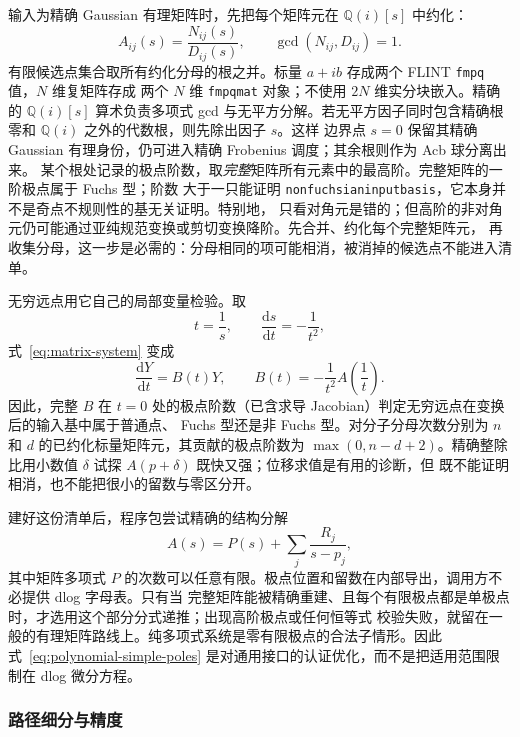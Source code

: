 \documentclass[11pt,a4paper]{ctexart}
\newcommand{\dd}{\mathrm d}
\renewcommand{\_}{\origunderscore\allowbreak}
\begin{document}
输入为精确 Gaussian 有理矩阵时，先把每个矩阵元在 $\mathbb Q(i)[s]$ 中约化：
\begin{equation}
 A_{ij}(s)=\frac{N_{ij}(s)}{D_{ij}(s)},
 \qquad \gcd(N_{ij},D_{ij})=1.
\end{equation}
有限候选点集合取所有约化分母的根之并。标量 $a+ib$ 存成两个 FLINT \texttt{fmpq} 值，$N$ 维复矩阵存成
两个 $N$ 维 \texttt{fmpq\_mat} 对象；不使用 $2N$ 维实分块嵌入。精确的 $\mathbb Q(i)[s]$ 算术负责多项式
gcd 与无平方分解。若无平方因子同时包含精确根零和 $\mathbb Q(i)$ 之外的代数根，则先除出因子 $s$。这样
边界点 $s=0$ 保留其精确 Gaussian 有理身份，仍可进入精确 Frobenius 调度；其余根则作为 Acb 球分离出来。
某个根处记录的极点阶数，取\emph{完整}矩阵所有元素中的最高阶。完整矩阵的一阶极点属于 Fuchs 型；阶数
大于一只能证明 \texttt{non\_fuchsian\_input\_basis}，它本身并不是奇点不规则性的基无关证明。特别地，
只看对角元是错的；但高阶的非对角元仍可能通过亚纯规范变换或剪切变换降阶。先合并、约化每个完整矩阵元，
再收集分母，这一步是必需的：分母相同的项可能相消，被消掉的候选点不能进入清单。

无穷远点用它自己的局部变量检验。取
\begin{equation}
 t=\frac{1}{s},\qquad \frac{\dd s}{\dd t}=-\frac{1}{t^2},
\end{equation}
式~\eqref{eq:matrix-system} 变成
\begin{equation}
 \frac{\dd Y}{\dd t}=B(t)Y,
 \qquad B(t)=-\frac{1}{t^2}A\!\left(\frac{1}{t}\right).
 \label{eq:infinity-transform}
\end{equation}
因此，完整 $B$ 在 $t=0$ 处的极点阶数（已含求导 Jacobian）判定无穷远点在变换后的输入基中属于普通点、
Fuchs 型还是非 Fuchs 型。对分子分母次数分别为 $n$ 和 $d$ 的已约化标量矩阵元，其贡献的极点阶数为
$\max(0,n-d+2)$。精确整除比用小数值 $\delta$ 试探 $A(p+\delta)$ 既快又强；位移求值是有用的诊断，但
既不能证明相消，也不能把很小的留数与零区分开。

建好这份清单后，程序包尝试精确的结构分解
\begin{equation}
 A(s)=P(s)+\sum_j\frac{R_j}{s-p_j},
 \label{eq:polynomial-simple-poles}
\end{equation}
其中矩阵多项式 $P$ 的次数可以任意有限。极点位置和留数在内部导出，调用方不必提供 dlog 字母表。只有当
完整矩阵能被精确重建、且每个有限极点都是单极点时，才选用这个部分分式递推；出现高阶极点或任何恒等式
校验失败，就留在一般的有理矩阵路线上。纯多项式系统是零有限极点的合法子情形。因此
式~\eqref{eq:polynomial-simple-poles} 是对通用接口的认证优化，而不是把适用范围限制在 dlog 微分方程。

\subsubsection{路径细分与精度}
\label{subsec:path}
\end{document}
